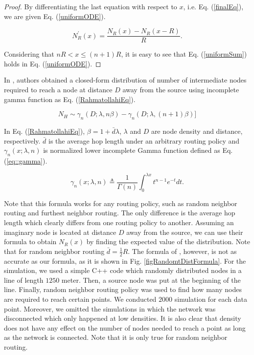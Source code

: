 \documentclass[12pt, draftclsnofoot, onecolumn]{IEEEtran}
\begin{document}
\begin{proof}
By differentiating the last equation with respect to $x$, i.e. Eq. (\ref{finalEq}), 
we are given Eq. (\ref{uniformODE}).

\begin{equation}
\label{uniformODE}
	N_R^{\prime}(x)= \frac{N_R(x) - N_R(x-R)}{R}.
\end{equation}

Considering that $nR{<}x{\leq}(n+1)R$, it is easy to see that 
Eq. (\ref{uniformSum}) holds in Eq. (\ref{uniformODE}).

\end{proof} 

In \cite{rahmatollahi2012closed}, authors obtained a closed-form distribution 
of number of intermediate nodes required to reach a node at distance $D$ away 
from the source using incomplete gamma function as Eq. (\ref{RahmatollahiEq}). 

\begin{equation}
\label{RahmatollahiEq}
	N_H \sim \gamma_{n}(D;\lambda, n\beta) - \gamma_{n}(D;\lambda,(n+1)\beta)]
\end{equation}

In Eq. (\ref{RahmatollahiEq}), $\beta=1+\bar{d}\lambda$, $\lambda$ 
and $D$ are node density and distance, respectively. $\bar{d}$ is the average hop length 
under an arbitrary routing policy and $\gamma_{n}(x;\lambda, n)$ 
is normalized lower incomplete Gamma function defined as Eq. (\ref{eq::gamma}).

\begin{equation}
\label{eq::gamma}
	\gamma_{n}(x;\lambda, n) \triangleq \frac{1}{\Gamma(n)} \int_{0}^{\lambda x} t^{n-1}e^{-t} dt.
\end{equation}

 Note that this formula works for any routing policy, such as random neighbor routing and furthest neighbor routing. The only difference is the average hop length which clearly differs from one routing policy to another. Assuming an imaginary node is located at distance $D$ away from 
the source, we can use their formula to obtain $N_R(x)$ by finding 
the expected value of the distribution. Note that for random neighbor 
routing $\bar{d}=\frac{1}{2}R$. The formula of \cite{rahmatollahi2012closed}, however, is not as accurate as 
our formula, as it is shown in Fig. \ref{figRandomtDistFormula}.
For the simulation, we used a simple C++ code which randomly distributed nodes in a line of length $1250$ meter. Then, a source node was put at the beginning of the line. Finally, random neighbor routing policy was used to find how many nodes are required to reach certain points. We conducted $2000$ simulation for each data point.
Moreover, we omitted the simulations in which the network was disconnected which only happened at low densities. It is also clear that density does not have any effect on the number of nodes needed to reach a point as long as the network is connected.  Note that it is only true for random neighbor routing.
\end{document}
